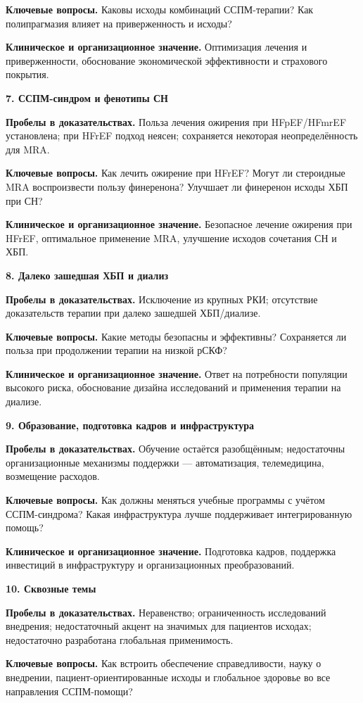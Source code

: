 \documentclass[11pt,a4paper]{article}
\newcommand{\heading}[1]{\par\medskip\textbf{#1}\par}
\begin{document}
\textbf{Ключевые вопросы.} Каковы исходы комбинаций ССПМ-терапии? Как полипрагмазия влияет на приверженность и исходы?

\textbf{Клиническое и организационное значение.} Оптимизация лечения и приверженности, обоснование экономической эффективности и страхового покрытия.

\heading{7. ССПМ-синдром и фенотипы СН}
\textbf{Пробелы в доказательствах.} Польза лечения ожирения при HFpEF/HFmrEF установлена; при HFrEF подход неясен; сохраняется некоторая неопределённость для MRA.

\textbf{Ключевые вопросы.} Как лечить ожирение при HFrEF? Могут ли стероидные MRA воспроизвести пользу финеренона? Улучшает ли финеренон исходы ХБП при СН?

\textbf{Клиническое и организационное значение.} Безопасное лечение ожирения при HFrEF, оптимальное применение MRA, улучшение исходов сочетания СН и ХБП.

\heading{8. Далеко зашедшая ХБП и диализ}
\textbf{Пробелы в доказательствах.} Исключение из крупных РКИ; отсутствие доказательств терапии при далеко зашедшей ХБП/диализе.

\textbf{Ключевые вопросы.} Какие методы безопасны и эффективны? Сохраняется ли польза при продолжении терапии на низкой рСКФ?

\textbf{Клиническое и организационное значение.} Ответ на потребности популяции высокого риска, обоснование дизайна исследований и применения терапии на диализе.

\heading{9. Образование, подготовка кадров и инфраструктура}
\textbf{Пробелы в доказательствах.} Обучение остаётся разобщённым; недостаточны организационные механизмы поддержки --- автоматизация, телемедицина, возмещение расходов.

\textbf{Ключевые вопросы.} Как должны меняться учебные программы с учётом ССПМ-синдрома? Какая инфраструктура лучше поддерживает интегрированную помощь?

\textbf{Клиническое и организационное значение.} Подготовка кадров, поддержка инвестиций в инфраструктуру и организационных преобразований.

\heading{10. Сквозные темы}
\textbf{Пробелы в доказательствах.} Неравенство; ограниченность исследований внедрения; недостаточный акцент на значимых для пациентов исходах; недостаточно разработана глобальная применимость.

\textbf{Ключевые вопросы.} Как встроить обеспечение справедливости, науку о внедрении, пациент-ориентированные исходы и глобальное здоровье во все направления ССПМ-помощи?
\end{document}

